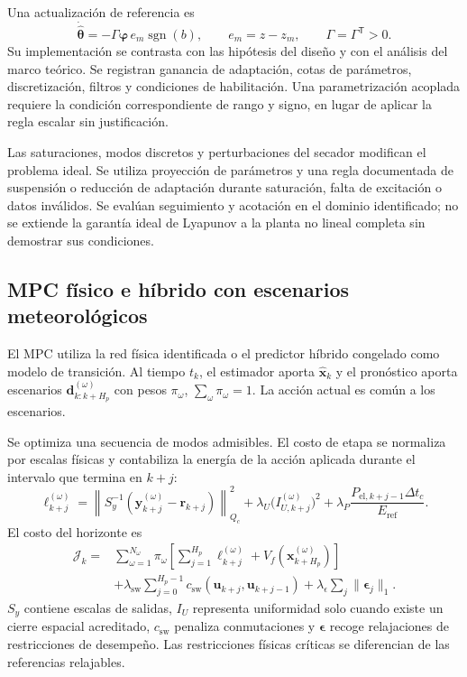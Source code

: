 Una actualización de referencia es
\begin{equation}
\dot{\widehat{\boldsymbol\theta}}
=-\Gamma\boldsymbol\varphi\,e_m
\operatorname{sgn}(b),
\qquad e_m=z-z_m,\qquad \Gamma=\Gamma^{\mathsf T}>0.
\label{met:mrac_actualizacion}
\end{equation}
Su implementación se contrasta con las hipótesis del diseño y con el análisis del marco teórico. Se registran ganancia de adaptación, cotas de parámetros, discretización, filtros y condiciones de habilitación. Una parametrización acoplada requiere la condición correspondiente de rango y signo, en lugar de aplicar la regla escalar sin justificación.

Las saturaciones, modos discretos y perturbaciones del secador modifican el problema ideal. Se utiliza proyección de parámetros y una regla documentada de suspensión o reducción de adaptación durante saturación, falta de excitación o datos inválidos. Se evalúan seguimiento y acotación en el dominio identificado; no se extiende la garantía ideal de Lyapunov a la planta no lineal completa sin demostrar sus condiciones.

\subsection{MPC físico e híbrido con escenarios meteorológicos}
\label{met:mpc}

El MPC utiliza la red física identificada o el predictor híbrido congelado como modelo de transición. Al tiempo $t_k$, el estimador aporta $\widehat{\mathbf x}_k$ y el pronóstico aporta escenarios $\mathbf d^{(\omega)}_{k:k+H_p}$ con pesos $\pi_\omega$, $\sum_\omega\pi_\omega=1$. La acción actual es común a los escenarios.

Se optimiza una secuencia de modos admisibles. El costo de etapa se normaliza por escalas físicas y contabiliza la energía de la acción aplicada durante el intervalo que termina en $k+j$:
\begin{equation}
\ell_{k+j}^{(\omega)}=
\left\|
S_y^{-1}(\mathbf y_{k+j}^{(\omega)}-\mathbf r_{k+j})
\right\|_{Q_c}^{2}
+\lambda_U\bigl(I_{U,k+j}^{(\omega)}\bigr)^{2}
+\lambda_P
\frac{P_{\mathrm{el},k+j-1}\Delta t_c}{E_{\mathrm{ref}}}.
\label{met:costo_etapa}
\end{equation}
El costo del horizonte es
\begin{equation}
\begin{split}
\mathcal J_k={}&
\sum_{\omega=1}^{N_\omega}\pi_\omega
\left[
\sum_{j=1}^{H_p}
\ell_{k+j}^{(\omega)}
+V_f(\mathbf x_{k+H_p}^{(\omega)})
\right]\\
&+\lambda_{\mathrm{sw}}\sum_{j=0}^{H_p-1}
c_{\mathrm{sw}}(\mathbf u_{k+j},\mathbf u_{k+j-1})
+\lambda_\epsilon\sum_j\|\boldsymbol\epsilon_j\|_1.
\end{split}
\label{met:costo_mpc}
\end{equation}
$S_y$ contiene escalas de salidas, $I_U$ representa uniformidad solo cuando existe un cierre espacial acreditado, $c_{\mathrm{sw}}$ penaliza conmutaciones y $\boldsymbol\epsilon$ recoge relajaciones de restricciones de desempeño. Las restricciones físicas críticas se diferencian de las referencias relajables.

